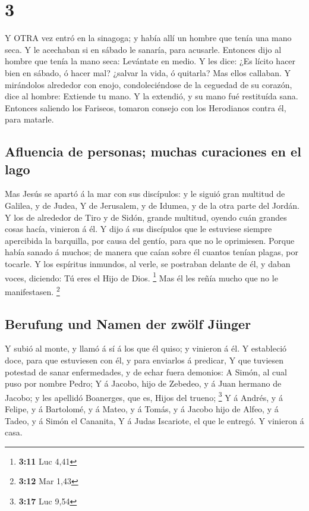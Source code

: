 \hypertarget{section-2}{%
\section{3}\label{section-2}}

 Y OTRA vez entró en la sinagoga; y había allí un hombre que
tenía una mano seca.  Y le acechaban si en sábado le
sanaría, para acusarle.  Entonces dijo al hombre que tenía
la mano seca: Levántate en medio.  Y les dice: ¿Es lícito
hacer bien en sábado, ó hacer mal? ¿salvar la vida, ó quitarla? Mas
ellos callaban.  Y mirándolos alrededor con enojo,
condoleciéndose de la ceguedad de su corazón, dice al hombre: Extiende
tu mano. Y la extendió, y su mano fué restituída sana. 
Entonces saliendo los Fariseos, tomaron consejo con los Herodianos
contra él, para matarle.

\hypertarget{afluencia-de-personas-muchas-curaciones-en-el-lago}{%
\subsection{Afluencia de personas; muchas curaciones en el
lago}\label{afluencia-de-personas-muchas-curaciones-en-el-lago}}

 Mas Jesús se apartó á la mar con sus discípulos: y le
siguió gran multitud de Galilea, y de Judea,  Y de
Jerusalem, y de Idumea, y de la otra parte del Jordán. Y los de
alrededor de Tiro y de Sidón, grande multitud, oyendo cuán grandes cosas
hacía, vinieron á él.  Y dijo á sus discípulos que le
estuviese siempre apercibida la barquilla, por causa del gentío, para
que no le oprimiesen.  Porque había sanado á muchos; de
manera que caían sobre él cuantos tenían plagas, por tocarle.
 Y los espíritus inmundos, al verle, se postraban delante
de él, y daban voces, diciendo: Tú eres el Hijo de Dios. \footnote{\textbf{3:11}
  Luc 4,41}  Mas él les reñía mucho que no le manifestasen.
\footnote{\textbf{3:12} Mar 1,43}

\hypertarget{berufung-und-namen-der-zwuxf6lf-juxfcnger}{%
\subsection{Berufung und Namen der zwölf
Jünger}\label{berufung-und-namen-der-zwuxf6lf-juxfcnger}}

 Y subió al monte, y llamó á sí á los que él quiso; y
vinieron á él.  Y estableció doce, para que estuviesen con
él, y para enviarlos á predicar,  Y que tuviesen potestad
de sanar enfermedades, y de echar fuera demonios:  A Simón,
al cual puso por nombre Pedro;  Y á Jacobo, hijo de
Zebedeo, y á Juan hermano de Jacobo; y les apellidó Boanerges, que es,
Hijos del trueno; \footnote{\textbf{3:17} Luc 9,54}  Y á
Andrés, y á Felipe, y á Bartolomé, y á Mateo, y á Tomás, y á Jacobo hijo
de Alfeo, y á Tadeo, y á Simón el Cananita,  Y á Judas
Iscariote, el que le entregó. Y vinieron á casa.

